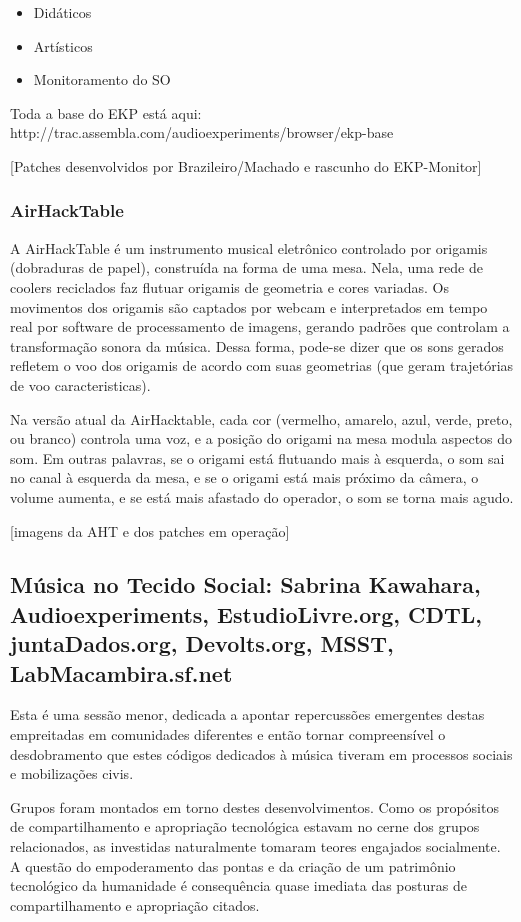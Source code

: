 \begin{itemize}
    \item Didáticos
    \item Artísticos
    \item Monitoramento do SO
\end{itemize}

Toda a base do EKP está aqui: http://trac.assembla.com/audioexperiments/browser/ekp-base

[Patches desenvolvidos por Brazileiro/Machado e rascunho do EKP-Monitor]

      \subsubsection{AirHackTable}

A AirHackTable é um instrumento musical eletrônico controlado por origamis (dobraduras de papel), construída na forma de uma mesa. Nela, uma rede de coolers reciclados faz flutuar origamis de geometria e cores variadas. Os movimentos dos origamis são captados por webcam e interpretados em tempo real por software de processamento de imagens, gerando padrões que controlam a transformação sonora da música. Dessa forma, pode-se dizer que os sons gerados refletem o voo dos origamis de acordo com suas geometrias (que geram trajetórias de voo caracteristicas).

Na versão atual da AirHacktable, cada cor (vermelho, amarelo, azul, verde, preto, ou branco) controla uma voz, e a posição do origami na mesa modula aspectos do som. Em outras palavras, se o origami está flutuando mais à esquerda, o som sai no canal à esquerda da mesa, e se o origami está mais próximo da câmera, o volume aumenta, e se está mais afastado do operador, o som se torna mais agudo. 

[imagens da AHT e dos patches em operação]

   \subsection{Música no Tecido Social: Sabrina Kawahara, Audioexperiments, EstudioLivre.org, CDTL, juntaDados.org, Devolts.org, MSST, LabMacambira.sf.net}

Esta é uma sessão menor, dedicada a apontar repercussões emergentes destas empreitadas em comunidades diferentes
e então tornar compreensível o desdobramento que estes códigos dedicados à música tiveram em processos sociais
e mobilizações civis.

Grupos foram montados em torno destes desenvolvimentos. Como os propósitos de compartilhamento
e apropriação tecnológica estavam no cerne dos grupos relacionados, as investidas
naturalmente tomaram teores engajados socialmente. A questão do empoderamento das pontas
e da criação de um patrimônio tecnológico da humanidade é consequência quase imediata
das posturas de compartilhamento e apropriação citados.

